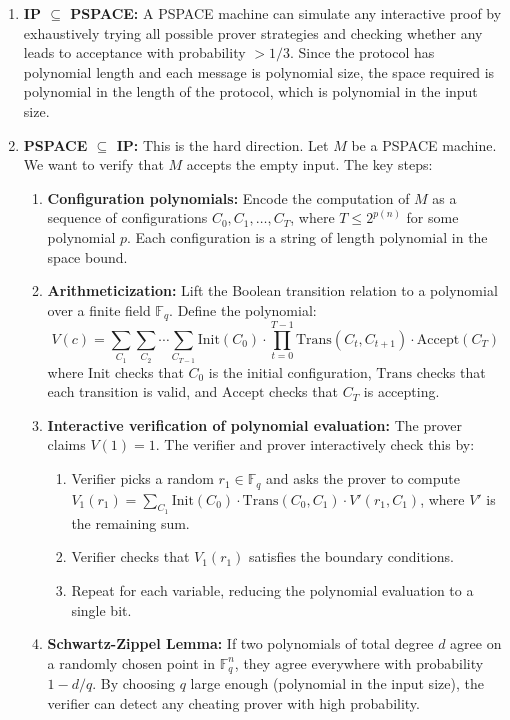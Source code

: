 \begin{enumerate}
\item \textbf{IP $\subseteq$ PSPACE:} A PSPACE machine can simulate any interactive proof by exhaustively trying all possible prover strategies and checking whether any leads to acceptance with probability $> 1/3$. Since the protocol has polynomial length and each message is polynomial size, the space required is polynomial in the length of the protocol, which is polynomial in the input size.

\item \textbf{PSPACE $\subseteq$ IP:} This is the hard direction. Let $M$ be a PSPACE machine. We want to verify that $M$ accepts the empty input. The key steps:
\begin{enumerate}
\item \textbf{Configuration polynomials:} Encode the computation of $M$ as a sequence of configurations $C_0, C_1, \ldots, C_T$, where $T \le 2^{p(n)}$ for some polynomial $p$. Each configuration is a string of length polynomial in the space bound.

\item \textbf{Arithmeticization:} Lift the Boolean transition relation to a polynomial over a finite field $\mathbb{F}_q$. Define the polynomial:
\[
V(c) = \sum_{C_1} \sum_{C_2} \cdots \sum_{C_{T-1}} \text{Init}(C_0) \cdot \prod_{t=0}^{T-1} \text{Trans}(C_t, C_{t+1}) \cdot \text{Accept}(C_T)
\]
where $\text{Init}$ checks that $C_0$ is the initial configuration, $\text{Trans}$ checks that each transition is valid, and $\text{Accept}$ checks that $C_T$ is accepting.

\item \textbf{Interactive verification of polynomial evaluation:} The prover claims $V(1) = 1$. The verifier and prover interactively check this by:
\begin{enumerate}
\item Verifier picks a random $r_1 \in \mathbb{F}_q$ and asks the prover to compute $V_1(r_1) = \sum_{C_1} \text{Init}(C_0) \cdot \text{Trans}(C_0, C_1) \cdot V'(r_1, C_1)$, where $V'$ is the remaining sum.
\item Verifier checks that $V_1(r_1)$ satisfies the boundary conditions.
\item Repeat for each variable, reducing the polynomial evaluation to a single bit.
\end{enumerate}

\item \textbf{Schwartz-Zippel Lemma:} If two polynomials of total degree $d$ agree on a randomly chosen point in $\mathbb{F}_q^n$, they agree everywhere with probability $1 - d/q$. By choosing $q$ large enough (polynomial in the input size), the verifier can detect any cheating prover with high probability.
\end{enumerate}
\end{enumerate}

